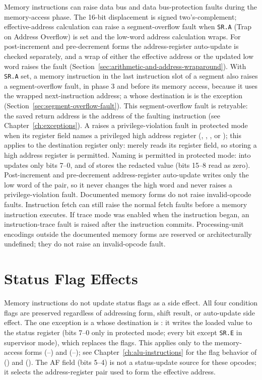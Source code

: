 \noindent Memory instructions can raise data bus and data bus-protection faults during the memory-access phase. The
16-bit displacement is signed two's-complement; effective-address calculation can raise a segment-overflow fault when
\texttt{SR.A} (Trap on Address Overflow) is set and the low-word address calculation wraps. For post-increment and
pre-decrement forms the address-register auto-update is checked separately, and a wrap of either the effective address
or the updated low word raises the fault (Section~\ref{sec:arithmetic-and-address-wraparound}). With \texttt{SR.A} set,
a memory instruction in the last instruction slot of a segment also raises a segment-overflow fault, in phase 3 and
before its memory access, because it uses the wrapped next-instruction address; a  whose destination is
 is the exception (Section~\ref{sec:segment-overflow-fault}). This segment-overflow
fault is retryable: the saved return address is the address of the faulting instruction (see
Chapter~\ref{ch:exceptions}). A  raises a privilege-violation fault in
protected mode when its register field names a privileged high address register (, , , or
); this applies to the  destination register only:  merely reads its
register field, so storing a high address register is permitted. Naming  is permitted in protected mode:  into 
updates only bits 7--0, and  of  stores the redacted value (bits 15--8 read as zero). Post-increment and pre-decrement address-register auto-update writes only the
low word of the pair, so it never changes the high word and never raises a privilege-violation fault. Documented
memory forms do not raise invalid-opcode faults. Instruction fetch can still raise the normal fetch faults before a
memory instruction executes. If trace mode was enabled when the instruction began, an instruction-trace fault is
raised after the instruction commits. Processing-unit encodings outside the documented memory forms are reserved or
architecturally undefined; they do not raise an invalid-opcode fault.

\section{Status Flag Effects}
\label{sec:memory-status-flags}

Memory instructions do not update status flags as a side effect. All four condition flags are preserved regardless of
addressing form, shift result, or auto-update side effect. The one exception is a  whose destination is
: it writes the loaded value to the status register (bits 7--0 only in protected mode; every bit except
\texttt{SR.E} in supervisor mode), which replaces the flags. This applies only to the memory-access 
forms (--) and  (--); see Chapter~\ref{ch:alu-instructions}
for the flag behavior of  () and  (). The AF field (bits 5--4) is
not a status-update source for these opcodes; it selects the address-register pair used to form the effective address.

